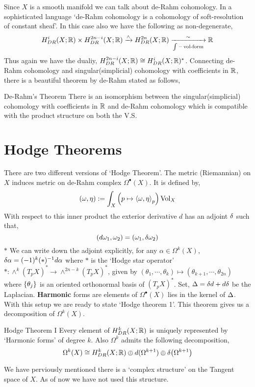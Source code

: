 \documentclass[11pt]{article}
\begin{document}
\noindent Since $X$ is a smooth manifold we can talk about de-Rahm cohomology. In a sophisticated language `de-Rahm cohomology is a cohomology of soft-resolution of constant sheaf'. In this case also we have the following as non-degenerate, 
\[H^{i}_{DR}(X;\mathbb{R}) \times H^{2n-i}_{DR}(X;\mathbb{R}) \xrightarrow{\wedge} H^{2n}_{DR}(X;\mathbb{R}) \xrightarrow[\int - \operatorname{vol-form}]{\sim} \mathbb{R}\]
Thus again we have the dualiy, $H^{2n-i}_{DR}(X;\mathbb{R}) \cong H^{i}_{DR}(X;\mathbb{R})^*$. Connecting de-Rahm cohomology and singular(simplicial) cohomology with coefficients in $\mathbb{R}$, there is a beautiful theorem by de-Rahm stated as follows, 

\begin{Thm}{De-Rahm's Theorem}{}
     There is an isomorphism between the singular(simplicial) cohomology with coefficients in $\mathbb{R}$ and de-Rahm cohomology which is compatible with the product structure on both the V.S. 
\end{Thm}

\section{Hodge Theorems}

There are two different versions of `Hodge Theorem'. The metric (Riemannian) on $X$ induces metric on de-Rahm complex $\Omega^{\bullet}(X)$. It is defined by, $$(\omega,\eta) := \int_{X} \qty(p \mapsto \left\langle {\omega}, {\eta} \right\rangle_p) \operatorname{Vol}_X$$
With respect to this inner product the exterior derivative $d$ has an adjoint $\delta$ such that, $$(d\omega_1,\omega_2)=(\omega_1,\delta \omega_2)$$
$\ast$ We can write down the adjoint explicitly, for any $\alpha \in \Omega^k(X)$, $\delta \alpha = (-1)^k (\ast)^{-1} d\alpha$ where $\ast$ is the `Hodge star operator' $\ast : \wedge^k (T_pX)^{\ast} \to \wedge^{2n-k} (T_pX)^{\ast}$, given by $(\theta_1,\cdots,\theta_k)\mapsto (\theta_{k+1},\cdots,\theta_{2n})$ where $\qty{\theta_j}$ is an oriented orthonormal basis of $(T_pX)^{\ast}$.  Set, $\Delta = \delta d + d \delta$ be the Laplacian. \textbf{Harmonic} forms are elements of $\Omega^{\bullet}(X)$ lies in the kernel of $\Delta$. With this setup we are ready to state `Hodge theorem 1'. This theorem gives us a decomposition of $\Omega^{k}(X)$. 

\begin{Thm}{Hodge Theorem I}{}
   Every element of $H^k_{DR}(X;\mathbb{R})$ is uniquely represented by `Harmonic forms' of degree $k$. Also $\Omega^k$ admits the following decomposition, 
   \[\Omega^k(X)\cong H^k_{DR}(X;\mathbb{R})\oplus d(\Omega^{k+1})\oplus \delta \qty(\Omega^{k+1})\]
\end{Thm}
\noindent We have perviously mentioned there is a `complex structure' on the Tangent space of $X$. As of now we have not used this structure. \newcommand{\om}{\mathbf{\Omega}}
\end{document}
